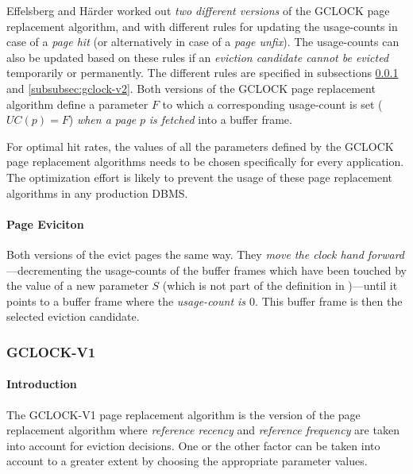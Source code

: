     Effelsberg and Härder worked out \emph{two different versions} of the GCLOCK page replacement algorithm,  and  with different rules for updating the usage-counts in case of a \emph{page hit} (or alternatively in case of a \emph{page unfix}). The usage-counts can also be updated based on these rules if an \emph{eviction candidate cannot be evicted} temporarily or permanently. The different rules are specified in subsections \ref{subsubsec:gclock-v1} and \ref{subsubsec:gclock-v2}. Both versions of the GCLOCK page replacement algorithm define a parameter $F$ to which a corresponding usage-count is set ($UC\left(p\right) = F$) \emph{when a page} $p$ \emph{is fetched} into a buffer frame.

    For optimal hit rates, the values of all the parameters defined by the GCLOCK page replacement algorithms needs to be chosen specifically for every application. The optimization effort is likely to prevent the usage of these page replacement algorithms in any production DBMS.

\paragraph{Page Eviciton}

    Both versions of the evict pages the same way. They \emph{move the clock hand forward}---decrementing the usage-counts of the buffer frames which have been touched by the value of a new parameter $S$ (which is not part of the definition in \cite{Effelsberg:1984})---until it points to a buffer frame where the \emph{usage-count is $0$}. This buffer frame is then the selected eviction candidate.

\subsubsection{GCLOCK-V1} \label{subsubsec:gclock-v1}

\paragraph{Introduction}

    The GCLOCK-V1 page replacement algorithm is the version of the  page replacement algorithm where \emph{reference recency} and \emph{reference frequency} are taken into account for eviction decisions. One or the other factor can be taken into account to a greater extent by choosing the appropriate parameter values.

